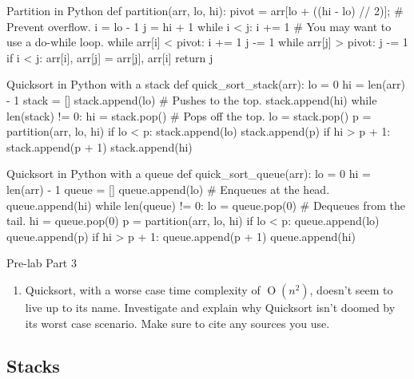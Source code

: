 \documentclass[11pt]{article}
\begin{document}
\begin{pythonlisting}{Partition in Python}
def partition(arr, lo, hi):
    pivot = arr[lo + ((hi - lo) // 2)]; # Prevent overflow.
    i = lo - 1
    j = hi + 1
    while i < j:
        i += 1 # You may want to use a do-while loop.
        while arr[i] < pivot:
            i += 1
        j -= 1
        while arr[j] > pivot:
            j -= 1
        if i < j:
            arr[i], arr[j] = arr[j], arr[i]
    return j
\end{pythonlisting}

\begin{pythonlisting}{Quicksort in Python with a stack}
def quick_sort_stack(arr):
    lo = 0
    hi = len(arr) - 1
    stack = []
    stack.append(lo) # Pushes to the top.
    stack.append(hi)
    while len(stack) != 0:
        hi = stack.pop() # Pops off the top.
        lo = stack.pop()
        p = partition(arr, lo, hi)
        if lo < p:
            stack.append(lo)
            stack.append(p)
        if hi > p + 1:
            stack.append(p + 1)
            stack.append(hi)
\end{pythonlisting}

\begin{pythonlisting}{Quicksort in Python with a queue}
def quick_sort_queue(arr):
    lo = 0
    hi = len(arr) - 1
    queue = []
    queue.append(lo) # Enqueues at the head.
    queue.append(hi)
    while len(queue) != 0:
        lo = queue.pop(0) # Dequeues from the tail.
        hi = queue.pop(0)
        p = partition(arr, lo, hi)
        if lo < p:
            queue.append(lo)
            queue.append(p)
        if hi > p + 1:
            queue.append(p + 1)
            queue.append(hi)
\end{pythonlisting}

\medskip
\begin{prelab}{Pre-lab Part 3}
  \begin{enumerate}
    \item Quicksort, with a worse case time complexity of
      $\operatorname{O}(n^2)$, doesn't seem to live up to its name.
      Investigate and explain why Quicksort isn't doomed by its worst
      case scenario. Make sure to cite any sources you use.
  \end{enumerate}
\end{prelab}

\subsection{Stacks}
\end{document}
